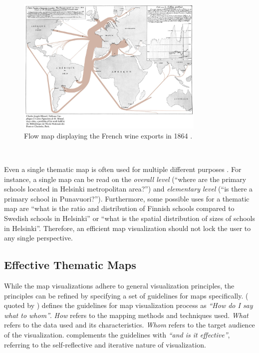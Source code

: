 \begin{figure}[htbp]
  \begin{center}
    \includegraphics[width=9cm]{images/flow-example.jpg}
    \caption{Flow map displaying the French wine exports in 1864 \citep{minard_carte_1865}.}
    \label{fig:flow}
  \end{center}
\end{figure}

~

Even a single thematic map is often used for multiple different purposes \citep[chap.~2]{schlichtmann_visualization_2002}. For instance, a single map can be read on the \emph{overall level} (``where are the primary schools located in Helsinki metropolitan area?'') and \emph{elementary level} (``is there a primary school in Punavuori?''). Furthermore, some possible uses for a thematic map are ``what is the ratio and distribution of Finnish schools compared to Swedish schools in Helsinki'' or ``what is the spatial distribution of sizes of schools in Helsinki''. Therefore, an efficient map visualization should not lock the user to any single perspective.  

\subsection{Effective Thematic Maps}
\label{subsection:effectivemaps}

While the map visualizations adhere to general visualization principles, the principles can be refined by specifying a set of guidelines for maps specifically. \citeauthor{koeman_het_1969} (\citeyear{koeman_het_1969} quoted by \citealt[p.~12]{kraak_cartographic_1998}) defines the guidelines for map visualization process as \emph{``How do I say what to whom''}. \emph{How} refers to the mapping methods and techniques used. \emph{What} refers to the data used and its characteristics. \emph{Whom} refers to the target audience of the visualization. \citet{kraak_cartographic_1998} complements the guidelines with \emph{``and is it effective''}, referring to the self-reflective and iterative nature of visualization.

